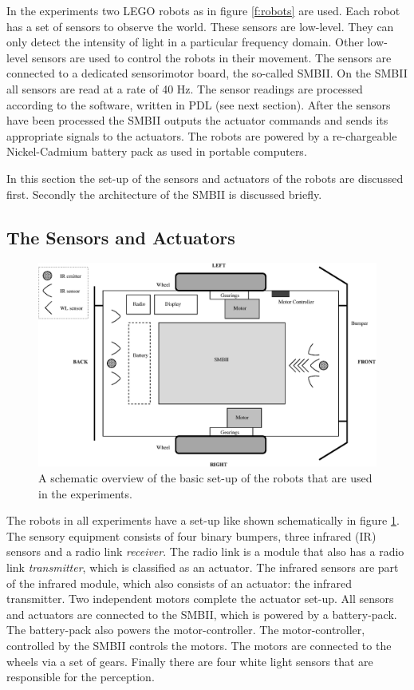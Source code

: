 In the experiments two LEGO robots as in figure \ref{f:robots} are used. Each robot has a set of sensors to observe the world. These sensors are low-level. They can only detect the intensity of light in a particular frequency domain. Other low-level sensors are used to control the robots in their movement. The sensors are connected to a dedicated sensorimotor board, the so-called SMBII. On the SMBII all sensors are read at a rate of 40 Hz. The sensor readings are processed according to the software, written in PDL (see next section). After the sensors have been processed the SMBII outputs the actuator commands and sends its appropriate signals to the actuators. The robots are powered by a re-chargeable Nickel-Cadmium battery pack as used in portable computers.

In this section the set-up of the sensors and actuators of the robots are discussed first. Secondly the architecture of the SMBII is discussed briefly.

\subsection{The Sensors and Actuators}\label{s:robots:sensors}

\begin{figure}[t]
\centerline{\includegraphics[width=12cm]{robots//schema_robots_exp2.eps}}
\caption{A schematic overview of the basic set-up of the robots that are used in the experiments.}
\label{f:robots:robots_general}
\end{figure}

The robots in all experiments have a set-up like shown schematically in figure \ref{f:robots:robots_general}. The sensory equipment consists of four binary bumpers, three infrared (IR) sensors and a radio link {\em receiver}. The radio link is a module that also has a radio link {\em transmitter}, which is classified as an actuator. The infrared sensors are part of the infrared module, which also consists of an actuator: the infrared transmitter. Two independent motors complete the actuator set-up. All sensors and actuators are connected to the SMBII, which is powered by a battery-pack. The battery-pack also powers the motor-controller. The motor-controller, controlled by the SMBII controls the motors. The motors are connected to the wheels via a set of gears. Finally there are four white light sensors that are responsible for the perception.

